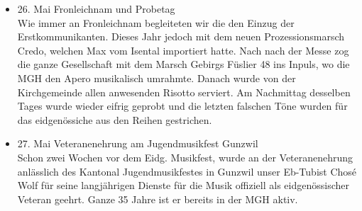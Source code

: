 \begin{history}
\begin{itemize}
            \item 26. Mai Fronleichnam und Probetag\\
                  Wie immer an Fronleichnam begleiteten wir die den Einzug der
                  Erstkommunikanten. Dieses Jahr jedoch mit dem neuen
                  Prozessionsmarsch Credo, welchen Max vom Isental importiert
                  hatte. Nach nach der Messe zog die ganze Gesellschaft mit dem
                  Marsch Gebirgs Füslier 48 ins Inpuls, wo die MGH den Apero
                  musikalisch umrahmte. Danach wurde von der Kirchgemeinde allen
                  anwesenden Risotto serviert. Am Nachmittag desselben Tages
                  wurde wieder eifrig geprobt und die letzten falschen Töne
                  wurden für das eidgenössiche aus den Reihen gestrichen.

            \item 27. Mai Veteranenehrung am Jugendmusikfest Gunzwil\\
                  Schon zwei Wochen vor dem Eidg. Musikfest, wurde an der
                  Veteranenehrung anlässlich des Kantonal Jugendmusikfestes in
                  Gunzwil unser Eb-Tubist Chosé Wolf für seine langjährigen
                  Dienste für die Musik offiziell als eidgenössischer Veteran
                  geehrt. Ganze 35 Jahre ist er bereits in der MGH aktiv.


\end{itemize}
\end{history}
